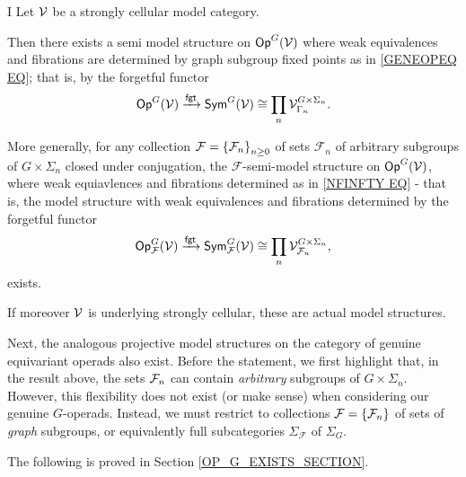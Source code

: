 \documentclass[a4paper,10pt]{article}%
\begin{document}
\begin{customthm}{I}\label{MAINEXIST1 THM}
Let $\mathcal V$ be a strongly cellular model category.

Then there exists a semi model structure on $\mathsf{Op}^G(\mathcal V)$ where weak equivalences and fibrations are determined by graph subgroup fixed points as in \ref{GENEOPEQ EQ}; that is, by the forgetful functor
\[
\mathsf{Op}^G(\mathcal V) \xrightarrow{\mathsf{fgt}} \mathsf{Sym}^G(\mathcal V) \cong \prod_n \mathcal V^{G \times \Sigma_n}_{\Gamma_n}.
\]

More generally, for any collection $\mathcal F = \left\{\mathcal F_n\right\}_{n\geq 0}$ of sets $\mathcal F_n$ of arbitrary subgroups of $G\times \Sigma_n$ closed under conjugation, the $\mathcal F$-semi-model structure on $\mathsf{Op}^G(\mathcal V)$, where weak equiavlences and fibrations determined as in \ref{NFINFTY EQ} - that is, the model structure with weak equivalences and fibrations determined by the forgetful functor
\[
\mathsf{Op}^G_{\mathcal F}(\mathcal V) \xrightarrow{\mathsf{fgt}} \mathsf{Sym}^G_{\mathcal F}(\mathcal V) \cong \prod_n \mathcal V^{G\times \Sigma_n}_{\mathcal F_n},
\]
exists.

If moreover $\mathcal V$ is underlying strongly cellular, these are actual model structures.
\end{customthm}

Next, the analogous projective model structures on the category of genuine equivariant operads also exist. 
Before the statement, we first highlight that, in the result above, the sets $\mathcal F_n$ can contain \textit{arbitrary} subgroups of $G\times \Sigma_n$. 
However, this flexibility does not exist (or make sense) when considering our genuine $G$-operads. 
Instead, we must restrict to collections ${\mathcal F} = \left\{{\mathcal F}_n\right\}$ of sets of \textit{graph} subgroups, or equivalently full subcategories $\Sigma_{\mathcal F}$ of $\Sigma_G$. 

The following is proved in Section \ref{OP_G_EXISTS_SECTION}.
\end{document}
